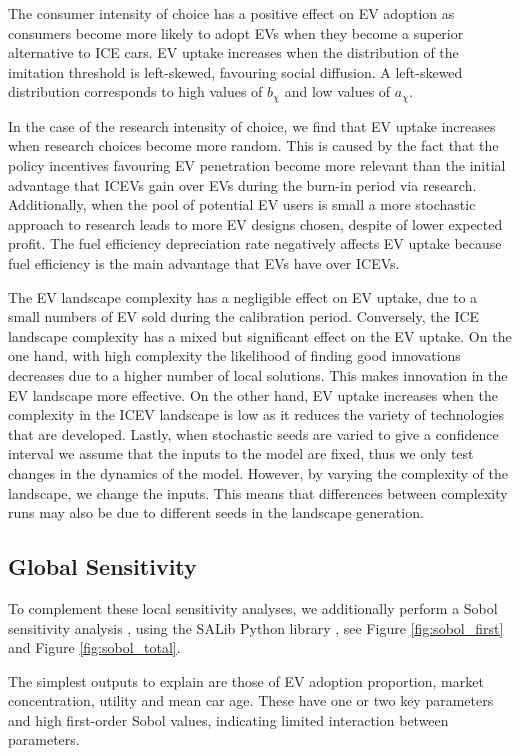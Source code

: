 \documentclass[12pt]{article}
\begin{document}
	The consumer intensity of choice has a positive effect on EV adoption as consumers become more likely to adopt EVs when they become a superior alternative to ICE cars. EV uptake increases when the distribution of the imitation threshold is left-skewed, favouring social diffusion. A left-skewed distribution corresponds to high values of $b_\chi$ and low values of $a_\chi$.
	
	In the case of the research intensity of choice, we find that EV uptake increases when research choices become more random. This is caused by the fact that the policy incentives favouring EV penetration become more relevant than the initial advantage that ICEVs gain over EVs during the burn-in period via research. Additionally, when the pool of potential EV users is small a more stochastic approach to research leads to more EV designs chosen, despite of lower expected profit. The fuel efficiency depreciation rate negatively affects EV uptake because fuel efficiency is the main advantage that EVs have over ICEVs.
	
	The EV landscape complexity has a negligible effect on EV uptake, due to a small numbers of EV sold during the calibration period. Conversely, the ICE landscape complexity has a mixed but significant effect on the EV uptake. On the one hand, with high complexity the likelihood of finding good innovations decreases due to a higher number of local solutions. This makes innovation in the EV landscape more effective. On the other hand, EV uptake increases when the complexity in the ICEV landscape is low as it reduces the variety of technologies that are developed. Lastly, when stochastic seeds are varied to give a confidence interval we assume that the inputs to the model are fixed, thus we only test changes in the dynamics of the model. However, by varying the complexity of the landscape, we change the inputs. This means that differences between complexity runs may also be due to different seeds in the landscape generation.

    \subsection{Global Sensitivity}
	To complement these local sensitivity analyses, we additionally perform a Sobol sensitivity analysis \citep{sobol2001global}, using the SALib Python library \citep{Herman2017}, see Figure \ref{fig:sobol_first} and Figure \ref{fig:sobol_total}. 
	
	The simplest outputs to explain are those of EV adoption proportion, market concentration, utility and mean car age. These have one or two key parameters and high first-order Sobol values, indicating limited interaction between parameters. 
	
\end{document}
